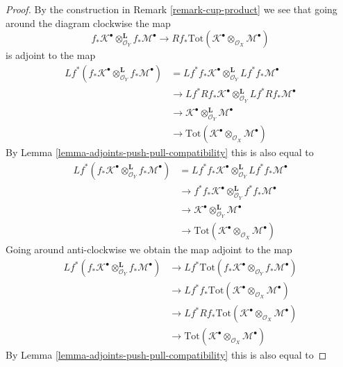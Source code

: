 \begin{proof}
By the construction in Remark \ref{remark-cup-product} we see that
going around the diagram clockwise the map
$$
f_*\mathcal{K}^\bullet
\otimes_{\mathcal{O}_Y}^\mathbf{L}
f_*\mathcal{M}^\bullet 
\longrightarrow
Rf_*\text{Tot}(\mathcal{K}^\bullet
\otimes_{\mathcal{O}_X}
\mathcal{M}^\bullet)
$$
is adjoint to the map
\begin{align*}
Lf^*(f_*\mathcal{K}^\bullet
\otimes_{\mathcal{O}_Y}^\mathbf{L}
f_*\mathcal{M}^\bullet)
& =
Lf^*f_*\mathcal{K}^\bullet
\otimes_{\mathcal{O}_Y}^\mathbf{L}
Lf^*f_*\mathcal{M}^\bullet \\
& \to
Lf^*Rf_*\mathcal{K}^\bullet
\otimes_{\mathcal{O}_Y}^\mathbf{L}
Lf^*Rf_*\mathcal{M}^\bullet \\
& \to
\mathcal{K}^\bullet
\otimes_{\mathcal{O}_Y}^\mathbf{L}
\mathcal{M}^\bullet \\
& \to
\text{Tot}(\mathcal{K}^\bullet
\otimes_{\mathcal{O}_X}
\mathcal{M}^\bullet)
\end{align*}
By Lemma \ref{lemma-adjoints-push-pull-compatibility} this is also equal to
\begin{align*}
Lf^*(f_*\mathcal{K}^\bullet
\otimes_{\mathcal{O}_Y}^\mathbf{L}
f_*\mathcal{M}^\bullet)
& =
Lf^*f_*\mathcal{K}^\bullet
\otimes_{\mathcal{O}_Y}^\mathbf{L}
Lf^*f_*\mathcal{M}^\bullet \\
& \to
f^*f_*\mathcal{K}^\bullet
\otimes_{\mathcal{O}_Y}^\mathbf{L}
f^*f_*\mathcal{M}^\bullet \\
& \to
\mathcal{K}^\bullet
\otimes_{\mathcal{O}_Y}^\mathbf{L}
\mathcal{M}^\bullet \\
& \to
\text{Tot}(\mathcal{K}^\bullet
\otimes_{\mathcal{O}_X}
\mathcal{M}^\bullet)
\end{align*}
Going around anti-clockwise we obtain the map adjoint to the map
\begin{align*}
Lf^*(f_*\mathcal{K}^\bullet
\otimes_{\mathcal{O}_Y}^\mathbf{L}
f_*\mathcal{M}^\bullet)
& \to
Lf^*\text{Tot}(
f_*\mathcal{K}^\bullet
\otimes_{\mathcal{O}_Y}
f_*\mathcal{M}^\bullet) \\
& \to
Lf^*f_*\text{Tot}(\mathcal{K}^\bullet
\otimes_{\mathcal{O}_X}
\mathcal{M}^\bullet) \\
& \to
Lf^*Rf_*\text{Tot}(\mathcal{K}^\bullet
\otimes_{\mathcal{O}_X}
\mathcal{M}^\bullet) \\
& \to
\text{Tot}(\mathcal{K}^\bullet
\otimes_{\mathcal{O}_X}
\mathcal{M}^\bullet)
\end{align*}
By Lemma \ref{lemma-adjoints-push-pull-compatibility} this is also equal to

\end{proof}
